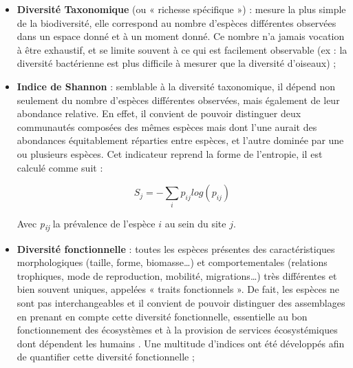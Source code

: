 \begin{itemize}
    \item \textbf{Diversité Taxonomique} (ou « richesse spécifique ») : mesure la plus simple de la biodiversité, elle correspond au nombre d’espèces différentes observées dans un espace donné et à un moment donné. Ce nombre n’a jamais vocation à être exhaustif, et se limite souvent à ce qui est facilement observable (ex : la diversité bactérienne est plus difficile à mesurer que la diversité d’oiseaux) ;
    
    \item \textbf{Indice de Shannon} \citep{magurran_measuring_2004} : semblable à la diversité taxonomique, il dépend non seulement du nombre d’espèces différentes observées, mais également de leur abondance relative. En effet, il convient de pouvoir distinguer deux communautés composées des mêmes espèces mais dont l’une aurait des abondances équitablement réparties entre espèces, et l’autre dominée par une ou plusieurs espèces. Cet indicateur reprend la forme de l’entropie, il est calculé comme suit :
    
    \begin{equation}
	    S_j=-\sum_{i}p_{ij} log(p_{ij})
	    \label{eqintro.1}
    \end{equation}
    
    Avec \textit{p\textsubscript{ij}} la prévalence de l’espèce $i$ au sein du site $j$.
    
    \item \textbf{Diversité fonctionnelle} : toutes les espèces présentes des caractéristiques morphologiques (taille, forme, biomasse…) et comportementales (relations trophiques, mode de reproduction, mobilité, migrations…) très différentes et bien souvent uniques, appelées « traits fonctionnels ». De fait, les espèces ne sont pas interchangeables et il convient de pouvoir distinguer des assemblages en prenant en compte cette diversité fonctionnelle, essentielle au bon fonctionnement des écosystèmes et à la provision de services écosystémiques dont dépendent les humains \citep{hooper_effects_2005, cadotte_using_2009, clemente_identifying_2010, faith_evosystem_2010}. Une multitude d’indices ont été développés afin de quantifier cette diversité fonctionnelle \citep{petchey_functional_2002, magurran_measuring_2004, mouchet_towards_2008, villeger_new_2008} ;
    

\end{itemize}
